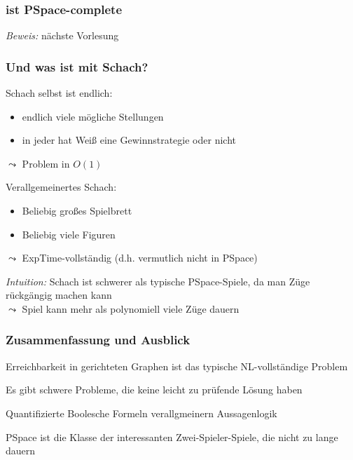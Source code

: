 \documentclass[also={handout}]{beamerswitch}
\begin{document}
\begin{frame}\frametitle{ ist PSpace-complete}

\pause

\emph{Beweis:} nächste Vorlesung

\end{frame}

\begin{frame}\frametitle{Und was ist mit Schach?}
\pause

Schach selbst ist endlich:
\begin{itemize}
\item endlich viele mögliche Stellungen
\item in jeder hat Weiß eine Gewinnstrategie oder nicht
\end{itemize}
$\leadsto$ Problem in $O(1)$
\bigskip\pause

\alert{Verallgemeinertes Schach:}
\begin{itemize}
\item Beliebig großes Spielbrett
\item Beliebig viele Figuren
\end{itemize}
$\leadsto$ ExpTime-vollständig (d.h. vermutlich nicht in PSpace)
\bigskip\pause

\emph{Intuition:} Schach ist schwerer als typische PSpace-Spiele, da man 
Züge rückgängig machen kann\\
$\leadsto$ Spiel kann mehr als polynomiell viele Züge dauern
\end{frame}



\begin{frame}\frametitle{Zusammenfassung und Ausblick}

Erreichbarkeit in gerichteten Graphen ist das typische NL-vollständige Problem
\bigskip

Es gibt schwere Probleme, die keine leicht zu prüfende Lösung haben\bigskip

Quantifizierte Boolesche Formeln verallgmeinern Aussagenlogik\bigskip

PSpace ist die Klasse der interessanten Zwei-Spieler-Spiele, die nicht zu lange dauern
\bigskip


\end{frame}
\end{document}
